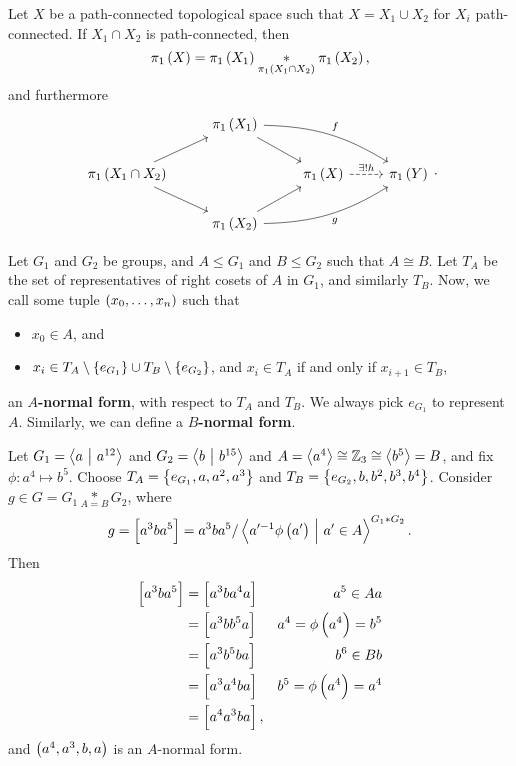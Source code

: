 \begin{theorem}
Let $ X $ be a path-connected topological space such that $ X = X_1 \cup X_2 $ for $ X_i $ path-connected. If $ X_1 \cap X_2 $ is path-connected, then
$$ \pi_1\br{X} = \pi_1\br{X_1} \underset{\pi_1\br{X_1 \cap X_2}}{*} \pi_1\br{X_2}, $$
and furthermore
$$
\begin{tikzcd}
& \pi_1\br{X_1} \arrow{dr} \arrow[bend left=15]{drr}{f} & & \\
\pi_1\br{X_1 \cap X_2} \arrow{ur} \arrow{dr} & & \pi_1\br{X} \arrow[dashed]{r}{\exists !h} & \pi_1\br{Y} \\
& \pi_1\br{X_2} \arrow{ur} \arrow[bend right=15, swap]{urr}{g} & &
\end{tikzcd}.
$$
\end{theorem}


\begin{definition}
Let $ G_1 $ and $ G_2 $ be groups, and $ A \le G_1 $ and $ B \le G_2 $ such that $ A \cong B $. Let $ T_A $ be the set of representatives of right cosets of $ A $ in $ G_1 $, and similarly $ T_B $. Now, we call some tuple $ \br{x_0, \dots, x_n} $ such that
\begin{itemize}
\item $ x_0 \in A $, and
\item $ x_i \in T_A \setminus \cbr{e_{G_1}} \cup T_B \setminus \cbr{e_{G_2}} $, and $ x_i \in T_A $ if and only if $ x_{i + 1} \in T_B $,
\end{itemize}
an \textbf{$ A $-normal form}, with respect to $ T_A $ and $ T_B $. We always pick $ e_{G_1} $ to represent $ A $. Similarly, we can define a \textbf{$ B $-normal form}.
\end{definition}

\begin{example}
Let $ G_1 = \left\langle a \ \middle| \  a^{12} \right\rangle $ and $ G_2 = \left\langle b \ \middle| \  b^{15} \right\rangle $ and $ A = \left\langle a^4 \right\rangle \cong \mathbb{Z}_3 \cong \left\langle b^5 \right\rangle = B $, and fix $ \phi : a^4 \mapsto b^5 $. Choose $ T_A = \cbr{e_{G_1}, a, a^2, a^3} $ and $ T_B = \cbr{e_{G_2}, b, b^2, b^3, b^4} $. Consider $ g \in G = G_1 \underset{A = B}{*} G_2 $, where
$$ g = \sbr{a^3ba^5} = a^3ba^5 / \abr{a'^{-1}\phi\br{a'} \st a' \in A}^{G_1 * G_2}. $$
Then
\begin{align*}
\sbr{a^3ba^5}
& = \sbr{a^3ba^4a} & a^5 \in Aa \\
& = \sbr{a^3bb^5a} & a^4 = \phi\br{a^4} = b^5 \\
& = \sbr{a^3b^5ba} & b^6 \in Bb \\
& = \sbr{a^3a^4ba} & b^5 = \phi\br{a^4} = a^4 \\
& = \sbr{a^4a^3ba},
\end{align*}
and $ \br{a^4, a^3, b, a} $ is an $ A $-normal form.
\end{example}

